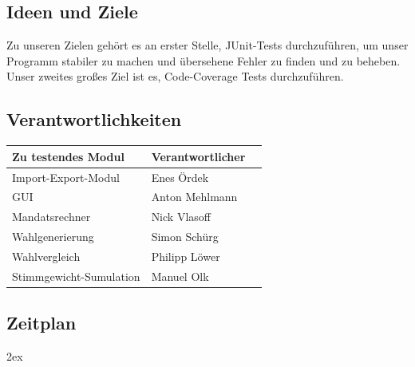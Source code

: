 \documentclass[12pt,a4paper,titlepage]{article}
\begin{document}
	\subsection{Ideen und Ziele}
Zu unseren Zielen gehört es an erster Stelle, JUnit-Tests durchzuführen, um unser Programm stabiler zu machen und übersehene Fehler zu finden und zu beheben. Unser zweites großes Ziel ist es, Code-Coverage Tests durchzuführen.

\subsection{Verantwortlichkeiten}
\begin{tabular}[h]{lll}
	\hline
	\textbf{Zu testendes Modul} & \textbf{Verantwortlicher} \\
	\hline
	Import-Export-Modul & Enes Ördek\\
	GUI & Anton Mehlmann\\
	Mandatsrechner &  Nick Vlasoff\\
	Wahlgenerierung &  Simon Schürg\\
	Wahlvergleich & Philipp Löwer\\
	Stimmgewicht-Sumulation & Manuel Olk\\
\end{tabular}

\subsection{Zeitplan}



\begingroup
\parindent 0pt
\parskip 2ex
\def\enotesize{\normalsize}

\endgroup
\end{document}
